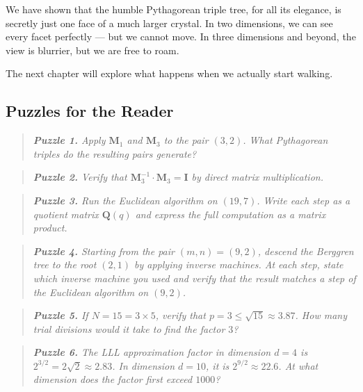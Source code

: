 We have shown that the humble Pythagorean triple tree, for all its elegance, is secretly just one face of a much larger crystal. In two dimensions, we can see every facet perfectly --- but we cannot move. In three dimensions and beyond, the view is blurrier, but we are free to roam.

The next chapter will explore what happens when we actually start walking.


\bigskip


\subsection*{Puzzles for the Reader}

\begin{quote}
\itshape \textbf{Puzzle 1.} Apply $\mathbf{M}_1$ and $\mathbf{M}_3$ to the pair $(3, 2)$. What Pythagorean triples do the resulting pairs generate?
\end{quote}

\begin{quote}
\itshape \textbf{Puzzle 2.} Verify that $\mathbf{M}_3^{-1} \cdot \mathbf{M}_3 = \mathbf{I}$ by direct matrix multiplication.
\end{quote}

\begin{quote}
\itshape \textbf{Puzzle 3.} Run the Euclidean algorithm on $(19, 7)$. Write each step as a quotient matrix $\mathbf{Q}(q)$ and express the full computation as a matrix product.
\end{quote}

\begin{quote}
\itshape \textbf{Puzzle 4.} Starting from the pair $(m, n) = (9, 2)$, descend the Berggren tree to the root $(2, 1)$ by applying inverse machines. At each step, state which inverse machine you used and verify that the result matches a step of the Euclidean algorithm on $(9, 2)$.
\end{quote}

\begin{quote}
\itshape \textbf{Puzzle 5.} If $N = 15 = 3 \times 5$, verify that $p = 3 \le \sqrt{15} \approx 3.87$. How many trial divisions would it take to find the factor $3$?
\end{quote}

\begin{quote}
\itshape \textbf{Puzzle 6.} The LLL approximation factor in dimension $d = 4$ is $2^{3/2} = 2\sqrt{2} \approx 2.83$. In dimension $d = 10$, it is $2^{9/2} \approx 22.6$. At what dimension does the factor first exceed $1000$?
\end{quote}

